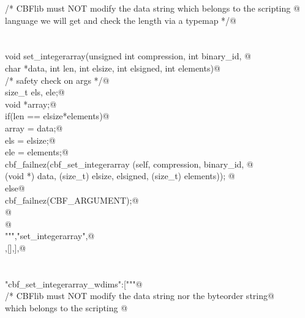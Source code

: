 \documentclass[10pt,a4paper,twoside,notitlepage]{article}
\begin{document}
\begin{flushleft}
\begin{minipage}{\linewidth}
\begin{list}{}{}
\mbox{}\verb@    /* CBFlib must NOT modify the data string which belongs to the scripting @\\
\mbox{}\verb@       language we will get and check the length via a typemap */@\\
\mbox{}\verb@@\\
\mbox{}\verb@%apply (char *STRING, int LENGTH) { (char *data, int len) } set_integerarray;@\\
\mbox{}\verb@@\\
\mbox{}\verb@    void set_integerarray(unsigned int compression, int binary_id, @\\
\mbox{}\verb@             char *data, int len, int elsize, int elsigned, int elements){@\\
\mbox{}\verb@        /* safety check on args */@\\
\mbox{}\verb@        size_t els, ele;@\\
\mbox{}\verb@        void *array;@\\
\mbox{}\verb@        if(len == elsize*elements){@\\
\mbox{}\verb@           array = data;@\\
\mbox{}\verb@           els = elsize;@\\
\mbox{}\verb@           ele = elements;@\\
\mbox{}\verb@           cbf_failnez(cbf_set_integerarray (self, compression, binary_id, @\\
\mbox{}\verb@           (void *) data,  (size_t) elsize, elsigned, (size_t) elements)); @\\
\mbox{}\verb@        }else{@\\
\mbox{}\verb@           cbf_failnez(CBF_ARGUMENT);@\\
\mbox{}\verb@        }@\\
\mbox{}\verb@    }@\\
\mbox{}\verb@""","set_integerarray",@\\
\mbox{},[],],@\\
\mbox{}\verb@@\\
\mbox{}\verb@@\\
\mbox{}\verb@"cbf_set_integerarray_wdims":["""@\\
\mbox{}\verb@    /* CBFlib must NOT modify the data string nor the byteorder string@\\
\mbox{}\verb@       which belongs to the scripting @\\

\end{list}
\end{minipage}
\end{flushleft}
\end{document}
